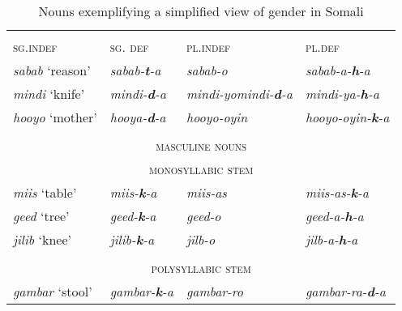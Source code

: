 \documentclass[output=paper]{langsci/langscibook}
\begin{document}
\begin{table}
\caption{Nouns exemplifying a simplified view of gender in Somali}
\label{tab:6}


\begin{tabularx}{\textwidth}{XXlX}
\lsptoprule
\multicolumn{4}{c}{{\textsc{feminine nouns}}} \\
{\textsc{sg.indef}} & {\textsc{sg. def}} & {\textsc{pl.indef}} & {\textsc{pl.def}}\\
\midrule
{\textit{sabab} ‘reason’} &  {\textit{sabab-}\textbf{\textit{t}}\textit{-a}} &{\textit{sabab-o}} & {\textit{sabab-a-}\textbf{\textit{h}}\textit{-a}}\\

{\textit{mindi} ‘knife’} & {\textit{mindi-}\textbf{\textit{d}}\textit{-a}} & {\textit{mindi-yo}}{\textit{mindi-}\textbf{\textit{d}}\textit{-a}} & {\textit{mindi-ya-}\textbf{\textit{h}}\textit{-a}}\\

{\textit{hooyo} ‘mother’} &{\textit{hooya-}\textbf{\textit{d}}\textit{-a}} & {\textit{hooyo-oyin}} & 
{\textit{hooyo-oyin-}\textbf{\textit{k}}\textit{-a}}\\

\\
\multicolumn{4}{c}{{\textsc{masculine nouns}}}\\
\multicolumn{4}{c}{{\textsc{monosyllabic stem}}}\\
\midrule

{\textit{miis} ‘table’} &  {\textit{miis-}\textbf{\textit{k}}\textit{-a}} & {\textit{miis-as}} &{\textit{miis-as-}\textbf{\textit{k}}\textit{-a}}\\

{\textit{geed} ‘tree’}  &  {\textit{geed-}\textbf{\textit{k}}\textit{-a}} & {\textit{geed-o}}  &{\textit{geed-a-}\textbf{\textit{h}}\textit{-a}}   \\

{\textit{jilib} ‘knee’} &  {\textit{jilib-}\textbf{\textit{k}}\textit{-a}}& {\textit{jilb-o}}  &{\textit{jilb-a-}\textbf{\textit{h}}\textit{-a}}\\
\\

\multicolumn{4}{c}{{\textsc{polysyllabic stem}}}\\
\midrule
{\textit{gambar} ‘stool’} & {\textit{gambar-}\textbf{\textit{k}}\textit{-a}} & {\textit{gambar-ro}}  &  {\textit{gambar-ra-}\textbf{\textit{d}}\textit{-a}} \\


\end{tabularx}
\end{table}
\end{document}
